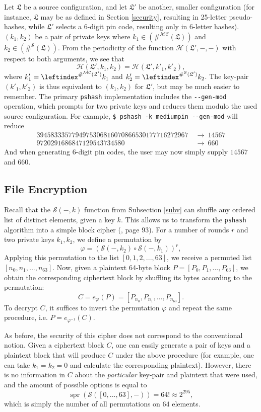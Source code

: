 \documentclass[a4paper, 10pt]{article}
\theoremstyle{plain}
\theoremstyle{definition}
\newcommand{\li}{\leftindex}
\newcommand{\spr}[1]{\operatorname{spr}(#1)}
\newcommand{\conf}{\mathfrak{L}}
\newcommand{\mc}{\mathcal{MC}}
\newcommand{\h}{\mathcal{H}}
\newcommand{\s}{\mathcal{S}}
\begin{document}
Let $\conf$ be a source configuration, and let $\conf'$ be another, smaller configuration (for instance, $\conf$ may be as defined in Section \ref{security}, resulting in 25-letter pseudo-hashes, while $\conf'$ selects a 6-digit pin code, resulting only in 6-letter hashes). $(k_1, k_2)$ be a pair of private keys where $k_1 \in \left(\#^\mc (\conf)\right)$ and $k_2 \in \left(\#^\s (\conf)\right)$. From the periodicity of the function $\h(\conf', -, -)$ with respect to both arguments, we see that
\[
  \h(\conf', k_1, k_2) = \h(\conf', k'_1, k'_2),
\]
where $k'_1 = \li^{\#^\mc (\conf')} k_1$ and $k'_2 = \li^{\#^\s (\conf')}k_2$. The key-pair $(k'_1, k'_2)$ is thus equivalent to $(k_1, k_2)$ for $\conf'$, but may be much easier to remember. The primary \texttt{pshash} implementation includes the \verb|--gen-mod| operation, which prompts for two private keys and reduces them modulo the used source configuration. For example, \verb|$ pshash -k mediumpin --gen-mod| will reduce
\begin{align*}
  3945833357794975306816070866530177716272967 \ &\longrightarrow \ 14567\\
  9720291686847129543734580 \ &\longrightarrow \ 660
\end{align*}
And when generating 6-digit pin codes, the user may now simply supply $14567$ and $660$.

\subsection{File Encryption}

Recall that the $\s(-, k)$ function from Subsection \ref{subv} can shuffle any ordered list of distinct elements, given a key $k$. This allows us to transform the \texttt{pshash} algorithm into a simple block cipher (\cite{serious}, page 93). For a number of rounds $r$ and two private keys $k_1, k_2$, we define a permutation by
\[
  \varphi = (\s(-, k_2) \circ \s(-, k_1))^r,
\]
Applying this permutation to the list $[0, 1, 2, ..., 63]$, we receive a permuted list $[n_0, n_1, ..., n_{63}]$. Now, given a plaintext 64-byte block $P = [P_0, P_1, ..., P_{63}]$, we obtain the corresponding ciphertext block by shuffling its bytes according to the permutation:
\[
  C = e_\varphi (P) = [P_{n_0}, P_{n_1}, ..., P_{n_{63}}].
\]
To decrypt $C$, it suffices to invert the permutation $\varphi$ and repeat the same procedure, i.e. $P = e_{\varphi^{-1}} (C)$.

As before, the security of this cipher does not correspond to the conventional notion. Given a ciphertext block $C$, one can easily generate a pair of keys and a plaintext block that will produce $C$ under the above procedure (for example, one can take $k_1 = k_2 = 0$ and calculate the corresponding plaintext). However, there is no information in $C$ about the \emph{particular} key-pair and plaintext that were used, and the amount of possible options is equal to
\[
  \spr{\s([0,...,63], -)} = 64! \approx 2^{295},
\]
which is simply the number of all permutations on $64$ elements.
\end{document}
